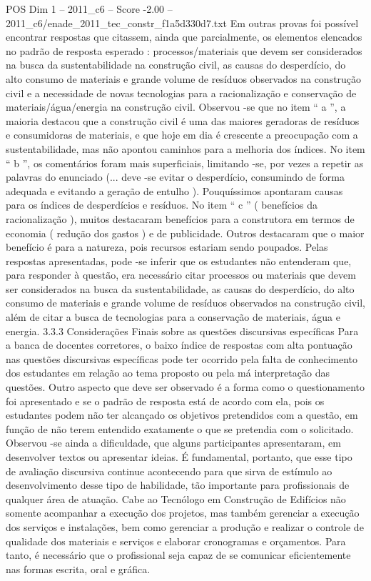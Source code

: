 \begin{textsample}{POS Dim 1 – 2011\_c6 – Score -2.00 – 2011\_c6/enade\_2011\_tec\_constr\_f1a5d330d7.txt}
Em outras provas foi possível encontrar respostas que citassem, ainda que parcialmente, os elementos elencados no padrão de resposta esperado : processos/materiais que devem ser considerados na busca da sustentabilidade na construção civil, as causas do desperdício, do alto consumo de materiais e grande volume de resíduos observados na construção civil e a necessidade de novas tecnologias para a racionalização e conservação de materiais/água/energia na construção civil.
Observou -se que no item “ a ”, a maioria destacou que a construção civil é uma das maiores geradoras de resíduos e consumidoras de materiais, e que hoje em dia é crescente a preocupação com a sustentabilidade, mas não apontou caminhos para a melhoria dos índices.
No item “ b ”, os comentários foram mais superficiais, limitando -se, por vezes a repetir as palavras do enunciado (... deve -se evitar o desperdício, consumindo de forma adequada e evitando a geração de entulho ).
Pouquíssimos apontaram causas para os índices de desperdícios e resíduos.
No item “ c ” ( benefícios da racionalização ), muitos destacaram benefícios para a construtora em termos de economia ( redução dos gastos ) e de publicidade.
Outros destacaram que o maior benefício é para a natureza, pois recursos estariam sendo poupados.
Pelas respostas apresentadas, pode -se inferir que os estudantes não entenderam que, para responder à questão, era necessário citar processos ou materiais que devem ser considerados na busca da sustentabilidade, as causas do desperdício, do alto consumo de materiais e grande volume de resíduos observados na construção civil, além de citar a busca de tecnologias para a conservação de materiais, água e energia. 3.3.3 Considerações Finais sobre as questões discursivas específicas Para a banca de docentes corretores, o baixo índice de respostas com alta pontuação nas questões discursivas específicas pode ter ocorrido pela falta de conhecimento dos estudantes em relação ao tema proposto ou pela má interpretação das questões.
Outro aspecto que deve ser observado é a forma como o questionamento foi apresentado e se o padrão de resposta está de acordo com ela, pois os estudantes podem não ter alcançado os objetivos pretendidos com a questão, em função de não terem entendido exatamente o que se pretendia com o solicitado.
Observou -se ainda a dificuldade, que alguns participantes apresentaram, em desenvolver textos ou apresentar ideias.
É fundamental, portanto, que esse tipo de avaliação discursiva continue acontecendo para que sirva de estímulo ao desenvolvimento desse tipo de habilidade, tão importante para profissionais de qualquer área de atuação.
Cabe ao Tecnólogo em Construção de Edifícios não somente acompanhar a execução dos projetos, mas também gerenciar a execução dos serviços e instalações, bem como gerenciar a produção e realizar o controle de qualidade dos materiais e serviços e elaborar cronogramas e orçamentos.
Para tanto, é necessário que o profissional seja capaz de se comunicar eficientemente nas formas escrita, oral e gráfica.

\end{textsample}
